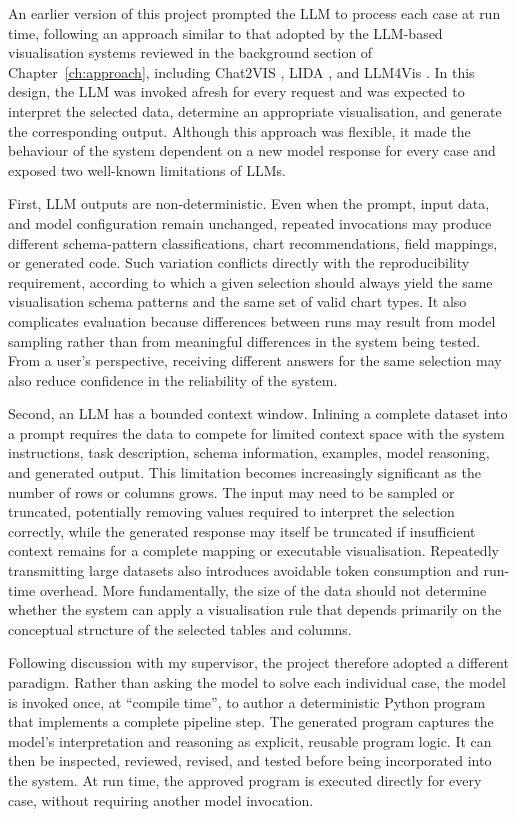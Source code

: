 An earlier version of this project prompted the LLM to process each case at run time, following an approach similar to that adopted by the LLM-based visualisation systems reviewed in the background section of Chapter~\ref{ch:approach}, including Chat2VIS \cite{maddigan2023chat2vis}, LIDA \cite{dibia2023lida}, and LLM4Vis \cite{wang2023llm4vis}. In this design, the LLM was invoked afresh for every request and was expected to interpret the selected data, determine an appropriate visualisation, and generate the corresponding output. Although this approach was flexible, it made the behaviour of the system dependent on a new model response for every case and exposed two well-known limitations of LLMs.

First, LLM outputs are non-deterministic. Even when the prompt, input data, and model configuration remain unchanged, repeated invocations may produce different schema-pattern classifications, chart recommendations, field mappings, or generated code. Such variation conflicts directly with the reproducibility requirement, according to which a given selection should always yield the same visualisation schema patterns and the same set of valid chart types. It also complicates evaluation because differences between runs may result from model sampling rather than from meaningful differences in the system being tested. From a user’s perspective, receiving different answers for the same selection may also reduce confidence in the reliability of the system.

Second, an LLM has a bounded context window. Inlining a complete dataset into a prompt requires the data to compete for limited context space with the system instructions, task description, schema information, examples, model reasoning, and generated output. This limitation becomes increasingly significant as the number of rows or columns grows. The input may need to be sampled or truncated, potentially removing values required to interpret the selection correctly, while the generated response may itself be truncated if insufficient context remains for a complete mapping or executable visualisation. Repeatedly transmitting large datasets also introduces avoidable token consumption and run-time overhead. More fundamentally, the size of the data should not determine whether the system can apply a visualisation rule that depends primarily on the conceptual structure of the selected tables and columns.

Following discussion with my supervisor, the project therefore adopted a different paradigm. Rather than asking the model to solve each individual case, the model is invoked once, at ``compile time'', to author a deterministic Python program that implements a complete pipeline step. The generated program captures the model’s interpretation and reasoning as explicit, reusable program logic. It can then be inspected, reviewed, revised, and tested before being incorporated into the system. At run time, the approved program is executed directly for every case, without requiring another model invocation.

